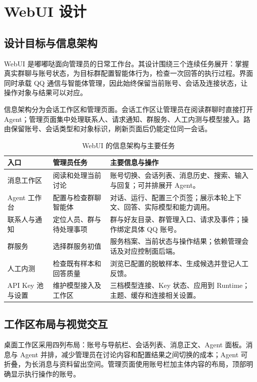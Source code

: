 \clearpage
\section{WebUI 设计}
\label{sec:webui}
\subsection{设计目标与信息架构}
WebUI 是嘟嘟哒面向管理员的日常工作台。其设计围绕三个连续任务展开：掌握真实群聊与账号状态，为目标群配置智能体行为，检查一次回答的执行过程。界面同时承载 QQ 通信与智能体管理，因此始终保留当前账号、会话及连接状态，让操作对象与结果可以对应。

信息架构分为会话工作区和管理页面。会话工作区让管理员在阅读群聊时直接打开 Agent；管理页面集中处理联系人、请求通知、群服务、人工内测与模型接入。路由保留账号、会话类型和对象标识，刷新页面后仍能定位同一会话。

\begin{table}[H]\centering
\caption{WebUI 的信息架构与主要任务}
\begin{tabularx}{\textwidth}{@{}L{29mm}L{42mm}Y@{}}\toprule
入口 & 管理员任务 & 主要信息与操作\\\midrule
消息工作区 & 阅读和处理当前讨论 & 账号切换、会话列表、消息历史、搜索、输入与回复；可并排展开 Agent。\\
Agent 工作台 & 配置与检查群聊智能体 & 对话、运行、配置三个页签；展示本轮上下文、回答、实际模型和能力调用。\\
联系人与通知 & 定位人员、群与待处理事项 & 群与好友目录、群管理入口、请求及事件；操作绑定具体 QQ 账号。\\
群服务 & 选择群服务初值 & 服务档案、当前状态与操作结果；依赖管理会话及对应控制面后端。\\
人工内测 & 检查既有样本和回答质量 & 浏览已配置的脱敏样本、生成候选并登记人工反馈。\\
API Key 池与设置 & 维护模型接入及工作区 & 三档模型连接、Key 状态、应用到 Runtime；主题、缓存和连接相关设置。\\\bottomrule
\end{tabularx}
\end{table}

\subsection{工作区布局与视觉交互}
桌面工作区采用四列布局：账号与导航栏、会话列表、消息正文、Agent 面板。消息与 Agent 并排，减少管理员在讨论内容和配置结果之间切换的成本；Agent 可折叠，为长消息与资料留出空间。管理页面使用账号栏加主体内容的布局，顶部明确显示执行操作的账号。

